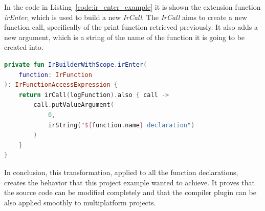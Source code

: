 In the code in Listing~\ref{code:ir_enter_example} it is shown the extension function \textit{irEnter}, which is used to build a new \textit{IrCall}. The \textit{IrCall} aims to create a new function call, specifically of the print function retrieved previously. It also adds a new argument, which is a string of the name of the function it is going to be created into.
\begin{lstlisting}[caption={Example of creation of a new function call and adding to it arguments}, captionpos=b, language=Kotlin, label={code:ir_enter_example}]
private fun IrBuilderWithScope.irEnter(
    function: IrFunction
): IrFunctionAccessExpression {
    return irCall(logFunction).also { call ->
        call.putValueArgument(
            0,
            irString("${function.name} declaration")
        )
    }
}
\end{lstlisting}

In conclusion, this transformation, applied to all the function declarations, creates the behavior that this project example wanted to achieve.\newline
It proves that the source code can be modified completely and that the compiler plugin can be also applied smoothly to multiplatform projects.